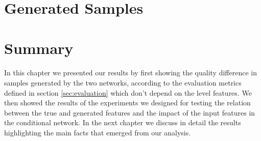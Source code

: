 \section{Generated Samples}
\section{Summary}
\paragraph{} In this chapter we presented our results by first showing the quality difference in samples generated by the two networks, according to the evaluation metrics defined in section \ref{sec:evaluation} which don't depend on the level features. We then showed the results of the experiments we designed for testing the relation between the true and generated features and the impact of the input features in the conditional network. In the next chapter we discuss in detail the results highlighting the main facts that emerged from our analysis.